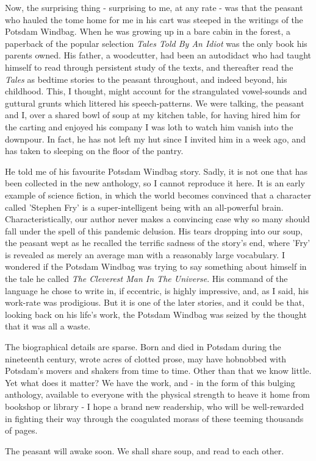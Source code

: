 Now, the surprising thing - surprising to me, at any rate - was that the peasant who hauled the tome home for me in his cart was steeped in the writings of the Potsdam Windbag. When he was growing up in a bare cabin in the forest, a paperback of the popular selection \emph{Tales Told By An Idiot} was the only book his parents owned. His father, a woodcutter, had been an autodidact who had taught himself to read through persistent study of the texts, and thereafter read the \emph{Tales} as bedtime stories to the peasant throughout, and indeed beyond, his childhood. This, I thought, might account for the strangulated vowel-sounds and guttural grunts which littered his speech-patterns. We were talking, the peasant and I, over a shared bowl of soup at my kitchen table, for having hired him for the carting and enjoyed his company I was loth to watch him vanish into the downpour. In fact, he has not left my hut since I invited him in a week ago, and has taken to sleeping on the floor of the pantry.

He told me of his favourite Potsdam Windbag story. Sadly, it is not one that has been collected in the new anthology, so I cannot reproduce it here. It is an early example of science fiction, in which the world becomes convinced that a character called 'Stephen Fry' is a super-intelligent being with an all-powerful brain. Characteristically, our author never makes a convincing case why so many should fall under the spell of this pandemic delusion. His tears dropping into our soup, the peasant wept as he recalled the terrific sadness of the story's end, where 'Fry' is revealed as merely an average man with a reasonably large vocabulary. I wondered if the Potsdam Windbag was trying to say something about himself in the tale he called \emph{The Cleverest Man In The Universe}. His command of the language he chose to write in, if eccentric, is highly impressive, and, as I said, his work-rate was prodigious. But it is one of the later stories, and it could be that, looking back on his life's work, the Potsdam Windbag was seized by the thought that it was all a waste.

The biographical details are sparse. Born and died in Potsdam during the nineteenth century, wrote acres of clotted prose, may have hobnobbed with Potsdam's movers and shakers from time to time. Other than that we know little. Yet what does it matter? We have the work, and - in the form of this bulging anthology, available to everyone with the physical strength to heave it home from bookshop or library - I hope a brand new readership, who will be well-rewarded in fighting their way through the coagulated morass of these teeming thousands of pages.

The peasant will awake soon. We shall share soup, and read to each other.